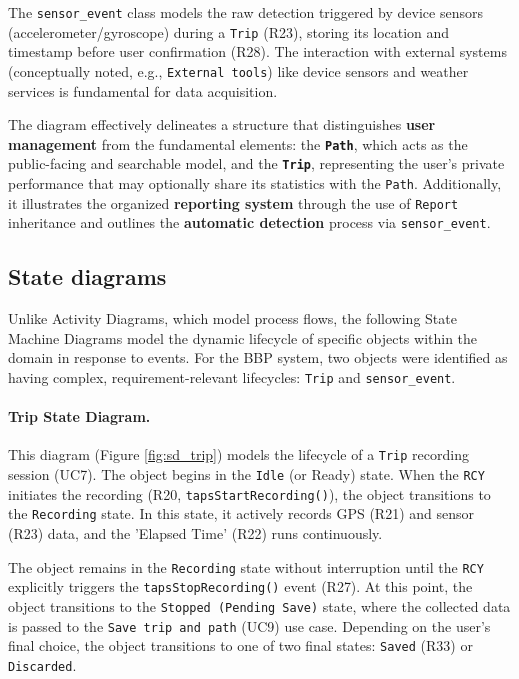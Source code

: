 The \texttt{sensor\_event} class models the raw detection triggered by device sensors (accelerometer/gyroscope) during a \texttt{Trip} (R23), storing its location and timestamp before user confirmation (R28). The interaction with external systems (conceptually noted, e.g., \texttt{External tools}) like device sensors and weather services is fundamental for data acquisition.

The diagram effectively delineates a structure that distinguishes \textbf{user management} from the fundamental elements: the \textbf{\texttt{Path}}, which acts as the public-facing and searchable model, and the \textbf{\texttt{Trip}}, representing the user's private performance that may optionally share its statistics with the \texttt{Path}. Additionally, it illustrates the organized \textbf{reporting system} through the use of \texttt{Report} inheritance and outlines the \textbf{automatic detection} process via \texttt{sensor\_event}.

\subsection{State diagrams}
\label{subsec:state_diagrams}%

Unlike Activity Diagrams, which model process flows, the following State Machine Diagrams model the dynamic lifecycle of specific objects within the domain in response to events. For the BBP system, two objects were identified as having complex, requirement-relevant lifecycles: \texttt{Trip} and \texttt{sensor\_event}.

\paragraph{Trip State Diagram.}
This diagram (Figure \ref{fig:sd_trip}) models the lifecycle of a \texttt{Trip} recording session (UC7). The object begins in the \texttt{Idle} (or Ready) state. When the \texttt{RCY} initiates the recording (R20, \texttt{tapsStartRecording()}), the object transitions to the \texttt{Recording} state. In this state, it actively records GPS (R21) and sensor (R23) data, and the 'Elapsed Time' (R22) runs continuously.

 The object remains in the \texttt{Recording} state without interruption until the \texttt{RCY} explicitly triggers the \texttt{tapsStopRecording()} event (R27). At this point, the object transitions to the \texttt{Stopped (Pending Save)} state, where the collected data is passed to the \texttt{Save trip and path} (UC9) use case. Depending on the user's final choice, the object transitions to one of two final states: \texttt{Saved} (R33) or \texttt{Discarded}.

